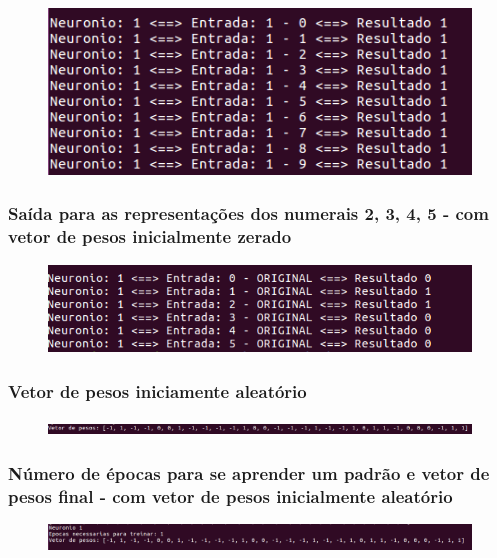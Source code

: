 \documentclass[hidelinks,12pt]{article}
\begin{document}
		\begin{figure}[!h]
			\centering
			\includegraphics[scale=0.7]{Figures/E1S1.png}
		\end{figure}
		
		\subsubsection{Saída para as representações dos numerais 2, 3, 4, 5 - com vetor de pesos inicialmente zerado}
		
		\begin{figure}[!h]
			\centering
			\includegraphics[scale=0.7]{Figures/E1SALL.png}
		\end{figure}
		
		\newpage
		
		\subsubsection{Vetor de pesos iniciamente aleatório}
		
		\begin{figure}[!h]
			\centering
			\includegraphics[scale=0.4]{Figures/E1P1R.png}
		\end{figure}
		
		\subsubsection{Número de épocas para se aprender um padrão e vetor de pesos final - com vetor de pesos inicialmente aleatório}
		
		\begin{figure}[!h]
			\centering
			\includegraphics[scale=0.4]{Figures/E1PE1R.png}
		\end{figure}
		
\end{document}
